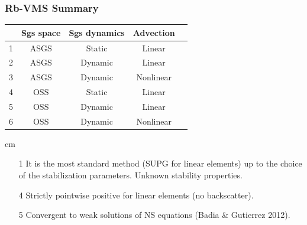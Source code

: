\begin{frame}[t]
\frametitle{Rb-VMS Summary}

\begin{table}[h]
\centering
\begin{tabular}{|c|c|c|c|c|}
\hline
& Sgs space & Sgs dynamics  &  Advection\\
\hline
1&ASGS      & Static  &  Linear    \\
2&ASGS      & Dynamic &  Linear    \\
3&ASGS      & Dynamic &  Nonlinear \\
\hline
4&OSS      & Static  &  Linear   \\
5&OSS      & Dynamic &  Linear   \\
6&OSS      & Dynamic &  Nonlinear \\
\hline
\end{tabular}
\end{table}
 cm
\begin{itemize}
\item[1] It is the most standard method (SUPG for linear elements) up to the choice of the
stabilization parameters. Unknown stability properties.
\item[4] Strictly pointwise positive for linear elements (no backscatter).
\item[5] Convergent to weak solutions of NS equations (Badia \& Gutierrez 2012).
\end{itemize}
\end{frame}
